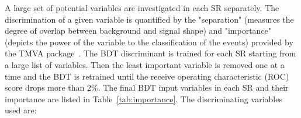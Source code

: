 \documentclass[PAPER, coverpage, atlasdraft=true, texlive=2016, UKenglish]{\ATLASLATEXPATH atlasdoc} %
\providecommand{\DIFadd}[1]{{\protect\color{blue}\uwave{#1}}} %
\providecommand{\DIFaddbegin}{} %
\providecommand{\DIFaddend}{} %
\begin{document}
A large set of potential variables are investigated in each SR separately. The discrimination of a given variable is quantified by the "separation" (measures the degree of overlap between background and signal shape) and "importance" (depicts the power of the variable to the classification of the events) provided by the TMVA package~\cite{Hocker:2007ht}.
The BDT discriminant is trained for each SR starting from a large list of variables. Then the least important variable is removed one at a time and the BDT is retrained until the
receive operating characteristic (ROC) score drops more than 2\%.
The final BDT input variables in each SR and their importance \DIFaddbegin \DIFadd{ranking }\DIFaddend are listed in Table~\ref{tab:importance}. The discriminating variables used are:
\end{document}
